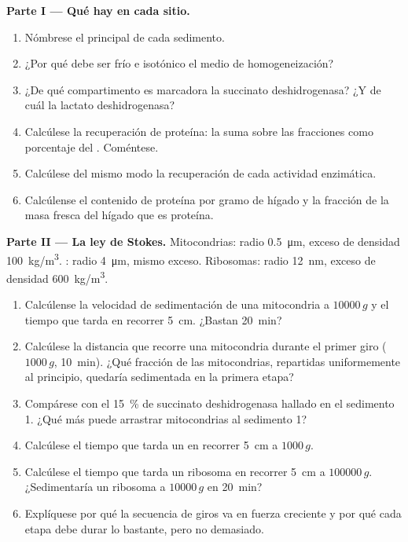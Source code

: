 \begin{problem}
\medskip
\noindent\textbf{Parte I --- Qué hay en cada sitio.}
\begin{enumerate}
  \item Nómbrese el  principal de cada sedimento.
  \item ¿Por qué debe ser frío e isotónico el medio de homogeneización?
  \item ¿De qué compartimento es marcadora la succinato deshidrogenasa? ¿Y
        de cuál la lactato deshidrogenasa?
  \item Calcúlese la recuperación de proteína: la suma sobre las fracciones
        como porcentaje del . Coméntese.
  \item Calcúlese del mismo modo la recuperación de cada actividad
        enzimática.
  \item Calcúlense el contenido de proteína por gramo de hígado y la
        fracción de la masa fresca del hígado que es proteína.
\end{enumerate}

\medskip
\noindent\textbf{Parte II --- La ley de Stokes.}
Mitocondrias: radio \qty{0.5}{\micro m}, exceso de densidad
\qty{100}{kg/m^3}. : radio \qty{4}{\micro m}, mismo exceso.
Ribosomas: radio \qty{12}{nm}, exceso de densidad \qty{600}{kg/m^3}.
\begin{enumerate}[resume]
  \item Calcúlense la velocidad de sedimentación de una mitocondria a
        $\num{10000}\,g$ y el tiempo que tarda en recorrer \qty{5}{cm}.
        ¿Bastan \qty{20}{min}?
  \item Calcúlese la distancia que recorre una mitocondria durante el
        primer giro ($1000\,g$, \qty{10}{min}). ¿Qué fracción de las
        mitocondrias, repartidas uniformemente al principio, quedaría
        sedimentada en la primera etapa?
  \item Compárese con el \qty{15}{\%} de succinato deshidrogenasa hallado
        en el sedimento 1. ¿Qué más puede arrastrar mitocondrias al
        sedimento 1?
  \item Calcúlese el tiempo que tarda un  en recorrer \qty{5}{cm} a
        $1000\,g$.
  \item Calcúlese el tiempo que tarda un ribosoma en recorrer \qty{5}{cm} a
        $\num{100000}\,g$. ¿Sedimentaría un ribosoma a $\num{10000}\,g$ en
        \qty{20}{min}?
  \item Explíquese por qué la secuencia de giros va en fuerza creciente y
        por qué cada etapa debe durar lo bastante, pero no demasiado.
\end{enumerate}


\end{problem}
